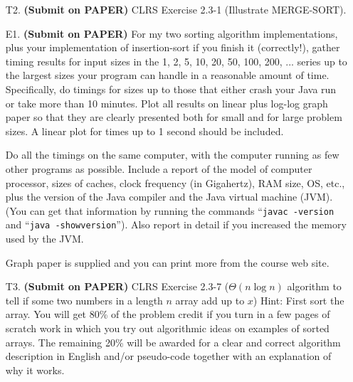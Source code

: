 \documentclass{article}
\begin{document}
\begin{itemize}
\item[T2.] \textbf{(Submit on PAPER)}
CLRS Exercise 2.3-1 (Illustrate MERGE-SORT).
\item[E1.] \textbf{(Submit on PAPER)}
For my two sorting algorithm implementations, plus your
implementation of insertion-sort if you finish it (correctly!), gather
timing results for input sizes in the 1, 2, 5, 10, 20, 50, 100, 200, ... 
series up to the largest sizes your program can handle in a reasonable amount
of time.  Specifically, do timings for sizes up to those that either crash 
your Java run or take more than 10 minutes.  Plot all results on linear
plus log-log graph paper so that they are clearly presented both for 
small and for large problem sizes.  A linear plot for times up to 1 second
should be included.  

Do all the timings on the same computer, with the computer running as
few other programs as possible.  Include a report of the model of
computer processor, sizes of caches, clock frequency (in Gigahertz),
RAM size, OS, etc., plus the version of the Java compiler and the Java
virtual machine (JVM).  (You can get that information by running the
commands ``\verb|javac -version| and ``\verb|java -showversion|'').
Also report in detail if you increased the memory used by the JVM.

Graph paper is supplied and you can print more from the course web site.

\item[T3.] \textbf{(Submit on PAPER)}
CLRS Exercise 2.3-7 ($\Theta(n \log n)$ algorithm to tell if
some two numbers in a length $n$ array add up to $x$) Hint: First sort the
array. You will get 80\% of the problem credit if you turn in a few
pages of scratch work in which you try out algorithmic ideas on examples of
sorted arrays.  The remaining 20\% will be awarded for a clear and correct
algorithm description in English and/or pseudo-code together with an
explanation of why it works.
\end{itemize}
\end{document}
